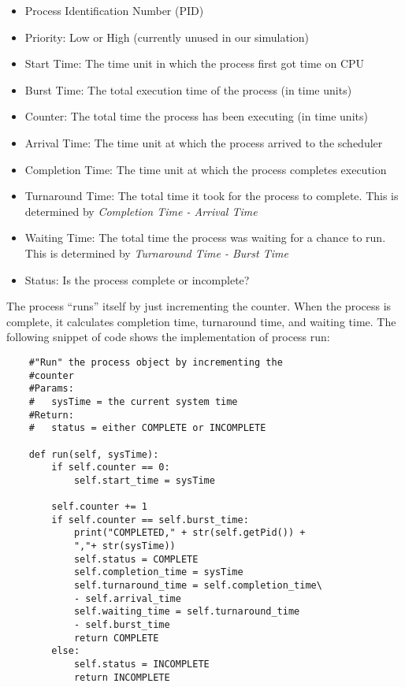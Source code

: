 \documentclass[a4paper]{article}
\begin{document}
\begin{itemize}
  \item Process Identification Number (PID)
  \item Priority: Low or High (currently unused in our simulation)
  \item Start Time: The time unit in which the process first got time on CPU
  \item Burst Time: The total execution time of the process (in time units)
  \item Counter: The total time the process has been executing (in time units)
  \item Arrival Time: The time unit at which the process arrived to the scheduler
  \item Completion Time: The time unit at which the process completes execution
  \item Turnaround Time: The total time it took for the process to complete. This is determined by \textit{Completion Time - Arrival Time}
  \item Waiting Time: The total time the process was waiting for a chance to run. This is determined by \textit{Turnaround Time - Burst Time}
  \item Status:  Is the process complete or incomplete? 
\end{itemize}
The process “runs” itself by just incrementing the counter. When the process is complete, it calculates completion time, turnaround time, and waiting time. The following snippet of code shows the implementation of process run:


\begin{lstlisting}
    #"Run" the process object by incrementing the
    #counter
    #Params:
    #   sysTime = the current system time
    #Return:
    #   status = either COMPLETE or INCOMPLETE 

    def run(self, sysTime):
        if self.counter == 0:
            self.start_time = sysTime

        self.counter += 1
        if self.counter == self.burst_time:
            print("COMPLETED," + str(self.getPid()) +
            ","+ str(sysTime))
            self.status = COMPLETE
            self.completion_time = sysTime
            self.turnaround_time = self.completion_time\
            - self.arrival_time
            self.waiting_time = self.turnaround_time
            - self.burst_time
            return COMPLETE
        else:
            self.status = INCOMPLETE
            return INCOMPLETE
\end{lstlisting}
\end{document}
